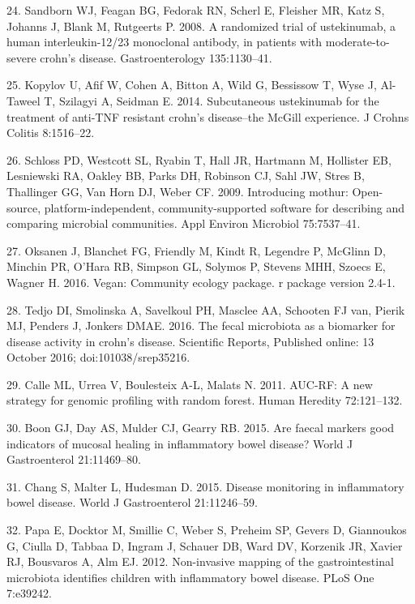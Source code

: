 \documentclass[11pt,]{article}
\begin{document}
\hypertarget{ref-sandborn_ust_2008}{}
24. Sandborn WJ, Feagan BG, Fedorak RN, Scherl E, Fleisher MR, Katz S,
Johanns J, Blank M, Rutgeerts P. 2008. A randomized trial of
ustekinumab, a human interleukin-12/23 monoclonal antibody, in patients
with moderate-to-severe crohn's disease. Gastroenterology 135:1130--41.

\hypertarget{ref-kopylov_ust_2014}{}
25. Kopylov U, Afif W, Cohen A, Bitton A, Wild G, Bessissow T, Wyse J,
Al-Taweel T, Szilagyi A, Seidman E. 2014. Subcutaneous ustekinumab for
the treatment of anti-TNF resistant crohn's disease--the McGill
experience. J Crohns Colitis 8:1516--22.

\hypertarget{ref-schloss_mothur_2009}{}
26. Schloss PD, Westcott SL, Ryabin T, Hall JR, Hartmann M, Hollister
EB, Lesniewski RA, Oakley BB, Parks DH, Robinson CJ, Sahl JW, Stres B,
Thallinger GG, Van Horn DJ, Weber CF. 2009. Introducing mothur:
Open-source, platform-independent, community-supported software for
describing and comparing microbial communities. Appl Environ Microbiol
75:7537--41.

\hypertarget{ref-oksanen_vegan_2016}{}
27. Oksanen J, Blanchet FG, Friendly M, Kindt R, Legendre P, McGlinn D,
Minchin PR, O'Hara RB, Simpson GL, Solymos P, Stevens MHH, Szoecs E,
Wagner H. 2016. Vegan: Community ecology package. r package version
2.4-1.

\hypertarget{ref-tedjo_CDactivity_2016}{}
28. Tedjo DI, Smolinska A, Savelkoul PH, Masclee AA, Schooten FJ van,
Pierik MJ, Penders J, Jonkers DMAE. 2016. The fecal microbiota as a
biomarker for disease activity in crohn's disease. Scientific Reports,
Published online: 13 October 2016; doi:101038/srep35216.

\hypertarget{ref-calle_aucrf_2011}{}
29. Calle ML, Urrea V, Boulesteix A-L, Malats N. 2011. AUC-RF: A new
strategy for genomic profiling with random forest. Human Heredity
72:121--132.

\hypertarget{ref-boon_fmarkers_2015}{}
30. Boon GJ, Day AS, Mulder CJ, Gearry RB. 2015. Are faecal markers good
indicators of mucosal healing in inflammatory bowel disease? World J
Gastroenterol 21:11469--80.

\hypertarget{ref-chang_monitoring_2015}{}
31. Chang S, Malter L, Hudesman D. 2015. Disease monitoring in
inflammatory bowel disease. World J Gastroenterol 21:11246--59.

\hypertarget{ref-papa_pedsIBD_2012}{}
32. Papa E, Docktor M, Smillie C, Weber S, Preheim SP, Gevers D,
Giannoukos G, Ciulla D, Tabbaa D, Ingram J, Schauer DB, Ward DV,
Korzenik JR, Xavier RJ, Bousvaros A, Alm EJ. 2012. Non-invasive mapping
of the gastrointestinal microbiota identifies children with inflammatory
bowel disease. PLoS One 7:e39242.
\end{document}
